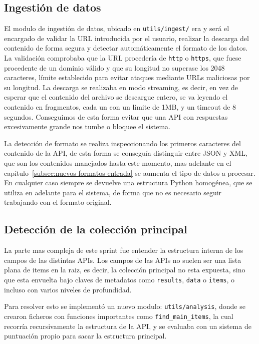 \subsection{Ingestión de datos}
\label{subsec:ingestion-datos}

El modulo de ingestión de datos, ubicado en \texttt{utils/ingest/} era y será el encargado de validar la URL introducida por el usuario, realizar la descarga del contenido
de forma segura y detectar automáticamente el formato de los datos. La validación comprobaba que la URL procedería de \texttt{http} o \texttt{https}, que fuese
procedente de un dominio válido y que su longitud no superase los 2048 caracteres, límite establecido para evitar ataques mediante URLs maliciosas por su longitud. La descarga se realizaba en modo streaming, es decir, en vez de esperar que
el contenido del archivo se descargue entero, se va leyendo el contenido en fragmentos, cada un con un límite de 1MB, y un timeout de 8 segundos. Conseguimos de 
esta forma evitar que una API con respuestas excesivamente grande nos tumbe o bloquee el sistema.

La detección de formato se realiza inspeccionando los primeros caracteres del contenido de la API, de esta forma se conseguía distinguir entre JSON y XML, que son 
los contenidos manejados hasta este momento, mas adelante en el capítulo~\ref{subsec:nuevos-formatos-entrada} se aumenta el tipo de datos a procesar. En cualquier caso 
siempre se devuelve una estructura Python homogénea, que se utiliza en adelante para el sistema, de forma que no es necesario seguir trabajando con el formato 
original.

\subsection{Detección de la colección principal}
\label{subsection:deteccion-coleccion-principal}

La parte mas compleja de este sprint fue entender la estructura interna de los campos de las distintas APIs. Los campos de las APIs no suelen ser una lista plana de items
en la raiz, es decir, la colección principal no esta expuesta, sino que esta envuelta bajo claves de metadatos como \texttt{results}, \texttt{data} o \texttt{items},
o incluso con varios niveles de profundidad. 

Para resolver esto se implementó un nuevo modulo: \texttt{utils/analysis}, donde se crearon ficheros con funciones importantes como \texttt{find\_main\_items}, la cual recorría recursivamente la estructura de la API, y se evaluaba con un sistema de puntuación propio para sacar la estructura principal.

